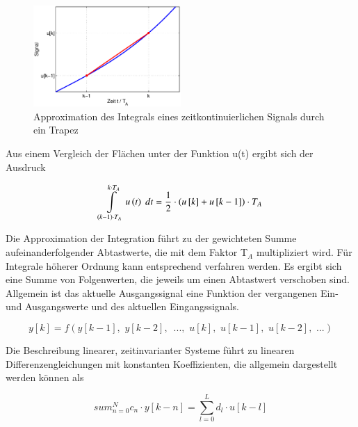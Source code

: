 \begin{figure}[H]
  \centerline{\includegraphics[width=0.5\textwidth]{Kapitel4/Bilder/image4.eps}}
  \caption{Approximation des Integrals eines zeitkontinuierlichen Signals durch ein Trapez}
  \label{fig:Differenzenquotient}
\end{figure}

\noindent Aus einem Vergleich der Fl\"{a}chen unter der Funktion u(t) ergibt sich der Ausdruck

\begin{equation}\label{eq:fourseven}
\int\limits _{\left(k-1\right)\cdot T_{A} }^{k\cdot T_{A} }u\left(t\right) {\rm \; }dt=\frac{1}{2} \cdot \left(u\left[k\right]+u\left[k-1\right]\right)\cdot T_{A}
\end{equation}

\noindent Die Approximation der Integration f\"{u}hrt zu der gewichteten Summe aufeinanderfolgender Abtastwerte, die mit dem Faktor T${}_{A}$ multipliziert wird. F\"{u}r Integrale h\"{o}herer Ordnung kann entsprechend verfahren werden. Es ergibt sich eine Summe von Folgenwerten, die jeweils um einen Abtastwert verschoben sind. Allgemein ist das aktuelle Ausgangssignal eine Funktion der vergangenen Ein- und Ausgangswerte und des aktuellen Eingangssignals.

\begin{equation}\label{eq:foureight}
y\left[k\right]=f\left(y\left[k-1\right],\, \, y\left[k-2\right],\, \, \, ...,\, \, u\left[k\right],\, \, u\left[k-1\right],\, \, u\left[k-2\right],\, \, ...\right)
\end{equation}

\noindent Die Beschreibung linearer, zeitinvarianter Systeme f\"{u}hrt zu linearen Differenzengleichungen mit konstanten Koeffizienten, die allgemein dargestellt werden k\"{o}nnen als

\begin{equation}\label{eq:fournine}
sum _{n=0}^{N}c_{n} \cdot y\left[k-n\right] =\sum _{l=0}^{L}d_{l} \cdot u\left[k-l\right]
\end{equation}

